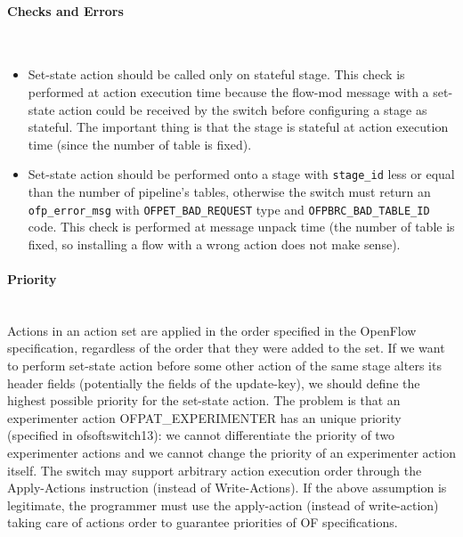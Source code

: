 \paragraph{Checks and Errors}\mbox{}\\
\begin{itemize}
    \item Set-state action should be called only on stateful stage. This check is performed at action execution time because the flow-mod message with a set-state action could be received by the switch before configuring a stage as stateful. The important thing is that the stage is stateful at action execution time (since the number of table is fixed).

    \item Set-state action should be performed onto a stage with \texttt{stage\_id} less or equal than the number of pipeline’s tables, otherwise the switch must return an \texttt{ofp\_error\_msg} with \texttt{OFPET\_BAD\_REQUEST} type and \texttt{OFPBRC\_BAD\_TABLE\_ID} code. This check is performed at message unpack time (the number of table is fixed, so installing a flow with a wrong action does not make sense).
\end{itemize}

\paragraph{Priority}\mbox{}\\
Actions in an action set are applied in the order specified in the OpenFlow specification, regardless of the order that they were added to the set.
If we want to perform set-state action before some other action of the same stage alters its header fields (potentially the fields of the update-key), we should define the highest possible priority for the set-state action.
The problem is that an experimenter action OFPAT\_EXPERIMENTER has an unique priority (specified in ofsoftswitch13): we cannot differentiate the priority of two experimenter actions and we cannot change the priority of an experimenter action itself.
The switch may support arbitrary action execution order through the Apply-Actions instruction (instead of Write-Actions).
If the above assumption is legitimate, the programmer must use the apply-action (instead of write-action) taking care of actions order to guarantee priorities of OF specifications.

